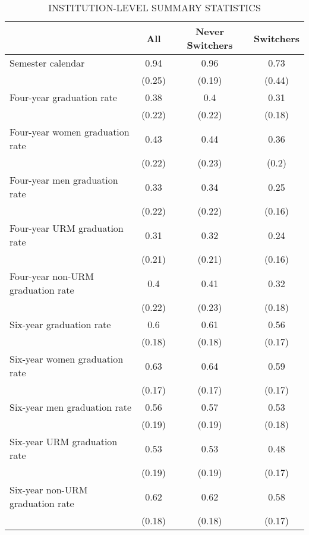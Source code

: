 \documentclass{article}
\begin{document}
\begin{table}[htbp]\centering \caption{ INSTITUTION-LEVEL SUMMARY STATISTICS \label{sumstat}}
\begin{tabular}{l c c c}\hline\hline
\multicolumn{1}{c}{\textbf{}}& {\textbf{All}} & \textbf{Never Switchers}
 & \textbf{Switchers} \\ \hline

Semester calendar 
& 0.94 & 0.96 & 0.73\\
& (0.25) & (0.19) & (0.44) \\

 Four-year graduation rate
 & 0.38 &  0.4 & 0.31\\
 & (0.22) & (0.22) & (0.18)\\
 
 Four-year women graduation rate
 & 0.43 &  0.44 & 0.36\\
 & (0.22) & (0.23) & (0.2)\\
 
 Four-year men graduation rate
 & 0.33 &  0.34 & 0.25\\
 & (0.22) & (0.22) & (0.16)\\
 
 Four-year URM graduation rate
 & 0.31 &  0.32 & 0.24\\
 & (0.21) & (0.21) & (0.16)\\
 
 Four-year non-URM graduation rate
 & 0.4 & 0.41 & 0.32\\
 & (0.22) & (0.23) & (0.18)\\
 
 Six-year graduation rate
 & 0.6 & 0.61& 0.56\\
 & (0.18) & (0.18) & (0.17)\\
 
 Six-year women graduation rate
 & 0.63 & 0.64& 0.59\\
 & (0.17) & (0.17) & (0.17)\\
 
 Six-year men graduation rate
 & 0.56 & 0.57 & 0.53\\
 & (0.19) & (0.19) & (0.18)\\
 
 Six-year URM graduation rate
 & 0.53 & 0.53 & 0.48\\
 & (0.19) & (0.19) & (0.17)\\
 
 Six-year non-URM graduation rate
 & 0.62 & 0.62 & 0.58\\
 & (0.18) & (0.18) & (0.17)\\
 

\end{tabular}
\end{table}
\end{document}
